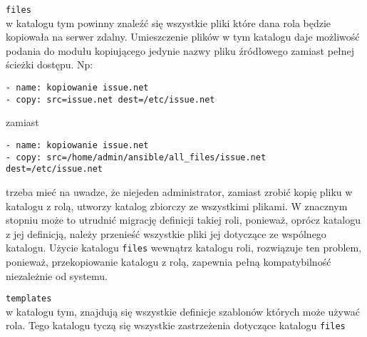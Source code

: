\begin{description}
	\item{\texttt{files}}\\
		w katalogu tym powinny znaleźć się wszystkie pliki które dana rola będzie kopiowała na serwer zdalny.
		Umieszczenie plików w tym katalogu daje możliwość podania do modułu kopiującego jedynie nazwy pliku źródłowego zamiast pełnej ścieżki dostępu. Np:
		\begin{lstlisting}
- name: kopiowanie issue.net
- copy: src=issue.net dest=/etc/issue.net
		\end{lstlisting}
		zamiast
		\begin{lstlisting}
- name: kopiowanie issue.net
- copy: src=/home/admin/ansible/all_files/issue.net dest=/etc/issue.net
		\end{lstlisting}
		trzeba mieć na uwadze, że niejeden administrator, zamiast zrobić kopię pliku w katalogu z rolą, utworzy katalog zbiorczy ze wszystkimi plikami.
		W znacznym stopniu może to utrudnić migrację definicji takiej roli, ponieważ, oprócz katalogu z jej definicją, należy przenieść wszystkie pliki jej dotyczące ze wspólnego katalogu.
		Użycie katalogu \texttt{files} wewnątrz katalogu roli, rozwiązuje ten problem, ponieważ, przekopiowanie katalogu z rolą, zapewnia pełną kompatybilność niezależnie od systemu.
	\item{\texttt{templates}}\\
		w katalogu tym, znajdują się wszystkie definicje szablonów których może używać rola.
		Tego katalogu tyczą się wszystkie zastrzeżenia dotyczące katalogu \texttt{files}


\end{description}
